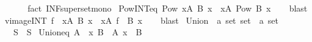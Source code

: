 \begin{isabellebody}
\ \ %
\isanewline
%
\isadelimproof
\ \ %
\endisadelimproof
%
\isatagproof
{}\isamarkupfalse%
\ {\isacharparenleft}{\kern0pt}fact\ INF{\isacharunderscore}{\kern0pt}superset{\isacharunderscore}{\kern0pt}mono{\isacharparenright}{\kern0pt}%
\endisatagproof
{\isafoldproof}%
%
\isadelimproof
\isanewline
%
\endisadelimproof
\isanewline
{}\isamarkupfalse%
\ Pow{\isacharunderscore}{\kern0pt}INT{\isacharunderscore}{\kern0pt}eq{\isacharcolon}{\kern0pt}\ {\isachardoublequoteopen}Pow\ {\isacharparenleft}{\kern0pt}{\isasymInter}x{\isasymin}A{\isachardot}{\kern0pt}\ B\ x{\isacharparenright}{\kern0pt}\ {\isacharequal}{\kern0pt}\ {\isacharparenleft}{\kern0pt}{\isasymInter}x{\isasymin}A{\isachardot}{\kern0pt}\ Pow\ {\isacharparenleft}{\kern0pt}B\ x{\isacharparenright}{\kern0pt}{\isacharparenright}{\kern0pt}{\isachardoublequoteclose}\isanewline
%
\isadelimproof
\ \ %
\endisadelimproof
%
\isatagproof
{}\isamarkupfalse%
\ blast%
\endisatagproof
{\isafoldproof}%
%
\isadelimproof
\isanewline
%
\endisadelimproof
\isanewline
{}\isamarkupfalse%
\ vimage{\isacharunderscore}{\kern0pt}INT{\isacharcolon}{\kern0pt}\ {\isachardoublequoteopen}f\ {\isacharminus}{\kern0pt}{\isacharbackquote}{\kern0pt}\ {\isacharparenleft}{\kern0pt}{\isasymInter}x{\isasymin}A{\isachardot}{\kern0pt}\ B\ x{\isacharparenright}{\kern0pt}\ {\isacharequal}{\kern0pt}\ {\isacharparenleft}{\kern0pt}{\isasymInter}x{\isasymin}A{\isachardot}{\kern0pt}\ f\ {\isacharminus}{\kern0pt}{\isacharbackquote}{\kern0pt}\ B\ x{\isacharparenright}{\kern0pt}{\isachardoublequoteclose}\isanewline
%
\isadelimproof
\ \ %
\endisadelimproof
%
\isatagproof
{}\isamarkupfalse%
\ blast%
\endisatagproof
{\isafoldproof}%
%
\isadelimproof
%
\endisadelimproof
%
\isadelimdocument
%
\endisadelimdocument
%
\isatagdocument
%
\isamarkuptrue%
%
\endisatagdocument
{\isafolddocument}%
%
\isadelimdocument
%
\endisadelimdocument
{}\isamarkupfalse%
\ Union\ {\isacharcolon}{\kern0pt}{\isacharcolon}{\kern0pt}\ {\isachardoublequoteopen}{\isacharprime}{\kern0pt}a\ set\ set\ {\isasymRightarrow}\ {\isacharprime}{\kern0pt}a\ set{\isachardoublequoteclose}\ \ {\isacharparenleft}{\kern0pt}{\isachardoublequoteopen}{\isasymUnion}{\isachardoublequoteclose}{\isacharparenright}{\kern0pt}\isanewline
\ \ \ {\isachardoublequoteopen}{\isasymUnion}S\ {\isasymequiv}\ {\isasymSqunion}S{\isachardoublequoteclose}\isanewline
\isanewline
{}\isamarkupfalse%
\ Union{\isacharunderscore}{\kern0pt}eq{\isacharcolon}{\kern0pt}\ {\isachardoublequoteopen}{\isasymUnion}A\ {\isacharequal}{\kern0pt}\ {\isacharbraceleft}{\kern0pt}x{\isachardot}{\kern0pt}\ {\isasymexists}B\ {\isasymin}\ A{\isachardot}{\kern0pt}\ x\ {\isasymin}\ B{\isacharbraceright}{\kern0pt}{\isachardoublequoteclose}\isanewline

\end{isabellebody}

